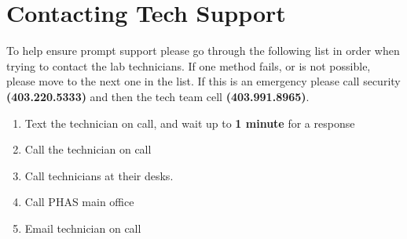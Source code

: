 \documentclass{../../../assets/LabArx1_5} 	%
\begin{document}



\maketitle

\section*{Contacting Tech Support}

To help ensure prompt support please go through the following list in order when trying to contact the lab technicians. If one method fails, or is not possible, please move to the next one in the list. If this is an emergency please call security {\bf (403.220.5333)} and then the tech team cell {\bf (403.991.8965)}.

\begin{enumerate}
\item Text the technician on call, and wait up to {\bf 1 minute} for a response
\item Call the technician on call
\item Call technicians at their desks.
\item Call PHAS main office
\item Email technician on call

\end{enumerate}
\end{document}

